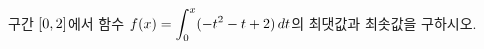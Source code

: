 구간 $[0{,}\mkern3mu\mathopen{}2]$에서 함수 $f(x)=\displaystyle\int_{0}^{x}(-t^2-t+2)\mkern3mu dt$의 최댓값과 최솟값을 구하시오.
